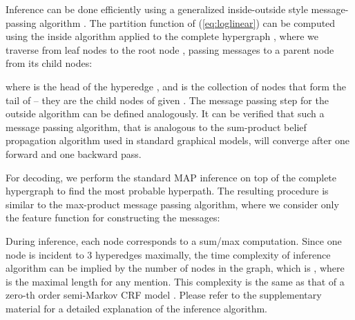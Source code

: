 \documentclass[11pt,a4paper]{article}
\theoremstyle{theorem}
\begin{document}
Inference can be done efficiently using a generalized inside-outside style message-passing algorithm \cite{baker1979trainable}.
The partition function of (\ref{eq:loglinear}) can be computed using the inside algorithm applied to the complete hypergraph , where we traverse from leaf nodes  to the root node , passing messages to a parent node  from its child nodes:
\begin{center}
\small

\end{center}
where  is the head of the hyperedge , and  is the collection of nodes that form the tail of  -- they are the child nodes of  given .
The message passing step for the outside algorithm can be defined analogously.
It can be verified that such a message passing algorithm, that is analogous to the sum-product belief propagation algorithm \cite{kschischang2001factor} used in {\color{black} standard graphical models}, will converge after one forward and one backward pass. 




For decoding, we perform the standard MAP inference on top of the complete hypergraph to find the most probable hyperpath.
The resulting procedure is similar to the max-product message passing algorithm, where we consider only the feature function  for constructing the messages:
\begin{center}
\small

\end{center}


During inference, each node corresponds to a sum/max computation.
Since one node is incident to 3 hyperedges maximally, the time complexity of inference algorithm can be implied by the number of nodes in the graph, 
which is , where  is the maximal length for any mention. 
This complexity is the same as that of a zero-th order semi-Markov CRF model \cite{sarawagi2005semi}.
Please refer to the supplementary material for a detailed explanation of the inference algorithm.
\end{document}
